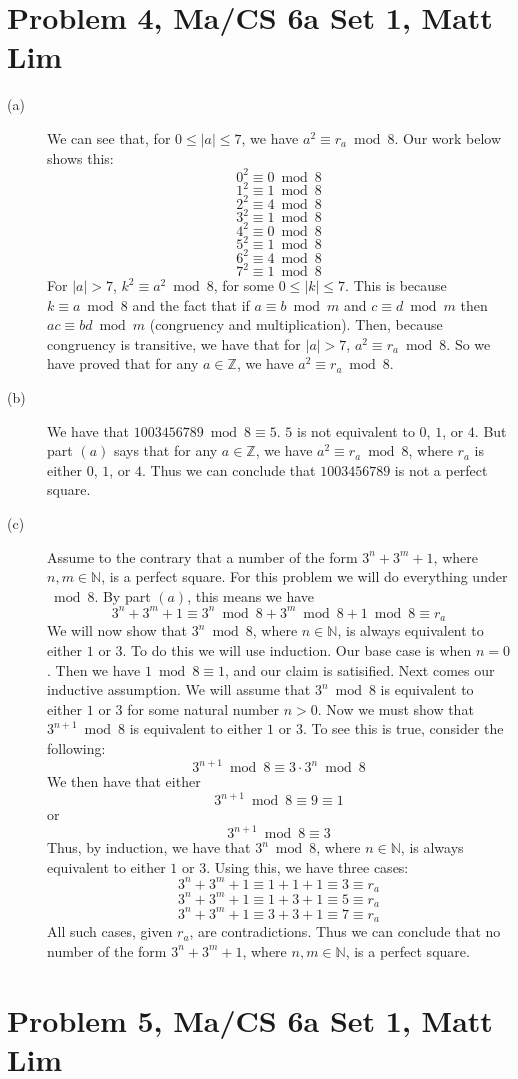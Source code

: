 \documentclass{article}
\begin{document}
\section*{Problem 4, Ma/CS 6a Set 1, Matt Lim}
\begin{description}
    \item[(a)] We can see that, for $0 \leq |a| \leq 7$, we have $a^2
        \equiv r_a \bmod 8$. Our work below shows this:
        \[ 0^2 \equiv 0 \bmod 8 \]
        \[ 1^2 \equiv 1 \bmod 8 \]
        \[ 2^2 \equiv 4 \bmod 8 \]
        \[ 3^2 \equiv 1 \bmod 8 \]
        \[ 4^2 \equiv 0 \bmod 8 \]
        \[ 5^2 \equiv 1 \bmod 8 \]
        \[ 6^2 \equiv 4 \bmod 8 \]
        \[ 7^2 \equiv 1 \bmod 8 \]
        For $|a| > 7$, $k^2 \equiv a^2 \bmod 8$, for some $0 \leq |k| \leq 7$.
        This is because $k \equiv a \bmod 8$ and the fact that if $a \equiv b \bmod
        m$ and $c \equiv d \bmod m$ then $ac \equiv bd \bmod m$ (congruency and
        multiplication). Then, because congruency is transitive, we have
        that for $|a| > 7$, $a^2 \equiv r_a \bmod 8$. So we have proved
        that for any $a \in \mathbb{Z}$, we have $a^2 \equiv r_a \bmod 8$.
    \item[(b)] We have that $1003456789 \bmod 8 \equiv 5$. $5$ is not equivalent to
        $0$, $1$, or $4$. But part $(a)$ says that for any $a \in \mathbb{Z}$,
        we have $a^2 \equiv r_a \bmod 8$, where $r_a$ is either $0$, $1$, or $4$.
        Thus we can conclude that $1003456789$ is not a perfect square.
    \item[(c)] Assume to the contrary that a number of the form
        $3^n + 3^m + 1$, where $n,m \in \mathbb{N}$, is a perfect square.
        For this problem we will do everything under $\bmod 8$.
        By part $(a)$, this means we have
        \[ 3^n + 3^m + 1 \equiv 3^n \bmod 8 + 3^m \bmod 8 + 1 \bmod 8 \equiv
            r_a \]
        We will now show that $3^n \bmod 8$, where $n \in \mathbb{N}$, is
        always equivalent to either $1$ or $3$. To do this we will use induction.
        Our base case is when $n=0$. Then we have $1 \bmod 8 \equiv 1$, and our
        claim is satisified. Next comes our inductive assumption. We will
        assume that $3^n \bmod 8$ is equivalent to either $1$ or $3$ for some
        natural number
        $n > 0$. Now we must show that $3^{n+1} \bmod 8$ is equivalent
        to either $1$ or $3$.  To see this is true, consider the following:
        \[ 3^{n+1} \bmod 8 \equiv 3 \cdot 3^n \bmod 8 \]
        We then have that either
        \[ 3^{n+1} \bmod 8 \equiv 9 \equiv 1 \]
        or
        \[ 3^{n+1} \bmod 8 \equiv 3 \]
        Thus, by induction, we have that $3^n \bmod 8$, where $n \in \mathbb{N}$,
        is always equivalent to either $1$ or $3$. Using this, we have
        three cases:
        \[ 3^n + 3^m + 1 \equiv 1+1+1 \equiv 3 \equiv r_a \]
        \[ 3^n + 3^m + 1 \equiv 1+3+1 \equiv 5 \equiv r_a \]
        \[ 3^n + 3^m + 1 \equiv 3+3+1 \equiv 7 \equiv r_a \]
        All such cases, given $r_a$, are contradictions. Thus we can conclude
        that no number of the form $3^n + 3^m + 1$, where $n,m \in \mathbb{N}$,
        is a perfect square.

\end{description}
\newpage
\section*{Problem 5, Ma/CS 6a Set 1, Matt Lim}
\newpage
\end{document}
